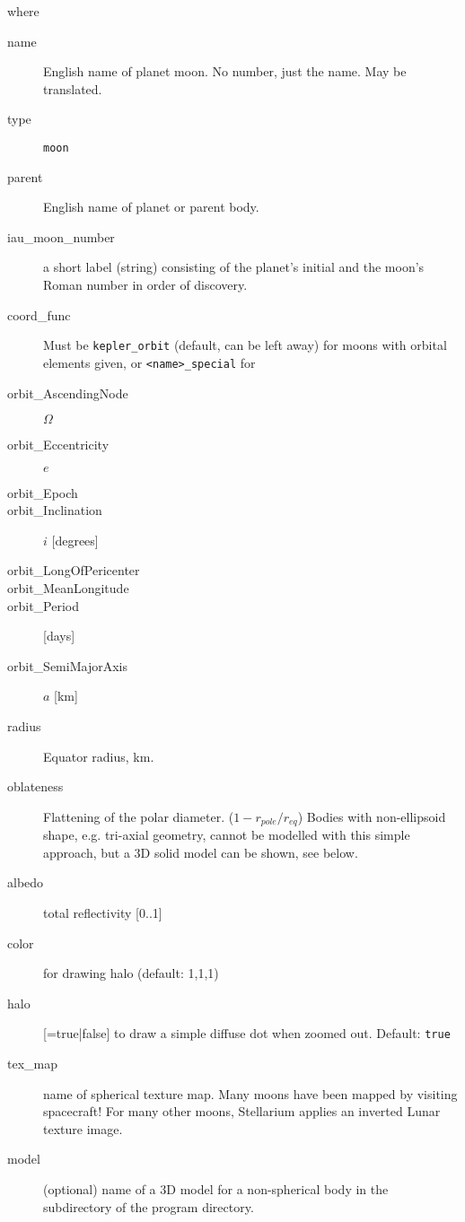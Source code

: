 where
\begin{description}
  \item[name] English name of planet moon. No number, just the name. May be translated.
  \item[type] \texttt{moon}

  \item[parent] English name of planet or parent body.
  \item[iau\_moon\_number] a short label (string) consisting of the planet's initial and the moon's Roman number in order of discovery.

  \item[coord\_func] Must be \texttt{kepler\_orbit} (default, can be left away) for moons with orbital elements given, or \texttt{<name>\_special} for 
  \item[orbit\_AscendingNode] $\Omega$
  \item[orbit\_Eccentricity] $e$
  \item[orbit\_Epoch] 
  \item[orbit\_Inclination] $i$ [degrees]
  \item[orbit\_LongOfPericenter] 
  \item[orbit\_MeanLongitude]
  \item[orbit\_Period] [days]
  \item[orbit\_SemiMajorAxis] $a$ [km]

  \item[radius] Equator radius, km.
  \item[oblateness] Flattening of the polar
    diameter. ($1-r_{pole}/r_{eq}$) Bodies with non-ellipsoid shape,
    e.g. tri-axial geometry, cannot be modelled with this simple
    approach, but a 3D solid model can be shown, see below.
    
  \item[albedo] total reflectivity [0..1]
  \item[color] for drawing halo (default: 1,1,1)
  \item[halo] [=true|false] to draw a simple diffuse dot when zoomed out. Default: \texttt{true}
  \item[tex\_map] name of spherical texture map. Many moons have been mapped by visiting spacecraft! For many other moons, Stellarium applies an inverted Lunar texture image.
  \item[model] (optional) name of a 3D model for a non-spherical body in the  subdirectory of the program directory. 


\end{description}
